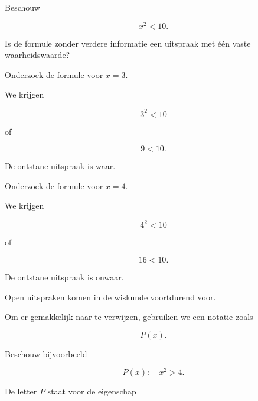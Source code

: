 \documentclass{ximera}
\begin{document}
\begin{oefening}{\oefB \ESS}

Beschouw

\[
x^2<10.
\]

\begin{question}
Is de formule zonder verdere informatie een uitspraak met één vaste
waarheidswaarde?

\begin{multipleChoice}
\end{multipleChoice}
\end{question}

\begin{question}
Onderzoek de formule voor $x=3$.

\begin{oplossing}
We krijgen

\[
3^2<10
\]

of

\[
9<10.
\]

De ontstane uitspraak is waar.
\end{oplossing}
\end{question}

\begin{question}
Onderzoek de formule voor $x=4$.

\begin{oplossing}
We krijgen

\[
4^2<10
\]

of

\[
16<10.
\]

De ontstane uitspraak is onwaar.
\end{oplossing}
\end{question}

\end{oefening}



Open uitspraken komen in de wiskunde voortdurend voor.

Om er gemakkelijk naar te verwijzen, gebruiken we een notatie zoals

\[
P(x).
\]

Beschouw bijvoorbeeld

\[
P(x):\quad x^2>4.
\]

De letter $P$ staat voor de eigenschap
\end{document}
